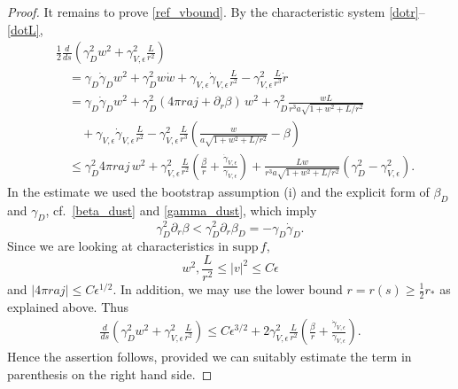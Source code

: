 \documentclass[11pt]{article}
\def\supp{\mathrm{supp}\,}
\begin{document}
\begin{proof}
  It remains to prove \eqref{ref_vbound}.
  By the characteristic system \eqref{dotr}--\eqref{dotL},
  \begin{align*}
    &
    \frac{1}{2}\frac{d}{ds}\left(\gamma_D^2 w^2
    + \gamma^2_{V,\epsilon} \frac{L}{r^2}\right)\\
    &
    \quad = \gamma_D \dot\gamma_D w^2 + \gamma_D^2 w \dot w
    + \gamma_{V,\epsilon} \dot\gamma_{V,\epsilon} \frac{L}{r^2}
    - \gamma^2_{V,\epsilon} \frac{L}{r^3}\dot r \\
    &
    \quad = \gamma_D \dot\gamma_D w^2 +
    \gamma_D^2 (4\pi r a j + \partial_r\beta)\,w^2
    + \gamma_D^2 \frac{w L}{r^3 a \sqrt{1+w^2 +L/r^2}}\\
    &\qquad
    {}+ \gamma_{V,\epsilon} \dot\gamma_{V,\epsilon} \frac{L}{r^2}
    - \gamma^2_{V,\epsilon} \frac{L}{r^3}
    \left(\frac{w}{a \sqrt{1+w^2 +L/r^2}} - \beta\right)  \\
    &
    \quad \leq \gamma_D^2 4\pi r a j \,w^2  + \gamma^2_{V,\epsilon}\frac{L}{r^2}
    \left(\frac{\beta}{r}+\frac{\dot\gamma_{V,\epsilon}}{\gamma_{V,\epsilon}}\right)
    +\frac{L w}{r^3 a \sqrt{1+w^2 +L/r^2}}(\gamma_D^2- \gamma^2_{V,\epsilon}). 
  \end{align*}
  In the estimate we used the bootstrap assumption (i) and
  the explicit form of $\beta_D$ and $\gamma_D$,
  cf.~\eqref{beta_dust} and \eqref{gamma_dust}, which imply
  \[
  \gamma_D^2\partial_r\beta < \gamma_D^2\partial_r\beta_D =
  - \gamma_D \dot\gamma_D .
  \]
  Since we are looking at characteristics in $\supp f$,
  \[
  w^2, \frac{L}{r^2}\leq |v|^2 \leq C \epsilon
  \]
  and $|4\pi r a j|\leq C \epsilon^{1/2}$. In addition, we may use the lower
  bound $r=r(s)\geq \frac{1}{2}r_\ast$ as explained above.
  Thus
  \begin{align}\label{wLest}
  \frac{d}{ds}\left(\gamma_D^2 w^2 + \gamma^2_{V,\epsilon} \frac{L}{r^2}\right)
  \leq C \epsilon^{3/2} + 2\gamma^2_{V,\epsilon}\frac{L}{r^2}
  \left(\frac{\beta}{r}+\frac{\dot\gamma_{V,\epsilon}}{\gamma_{V,\epsilon}}\right).
  \end{align}
  Hence the assertion follows, provided we can suitably estimate the term
  in parenthesis on the right hand side.


\end{proof}
\end{document}
